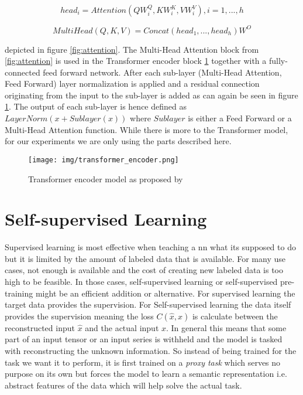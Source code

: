 \begin{equation}
	head_i = Attention(QW^Q_i, KW^K_i, VW^V_i), i = 1, ..., h
\end{equation}

\begin{equation}
	MultiHead(Q,K,V) = Concat(head_1, ..., head_h)W^O
\end{equation}

depicted in figure \ref{fig:attention}. The Multi-Head Attention block from \ref{fig:attention} is
used in the Transformer encoder block \ref{fig:transformer_encoder} together with a fully-connected feed forward network. After each sub-layer (Multi-Head Attention, Feed Forward) layer normalization is applied and a residual connection originating from the input to the sub-layer is added as can again be seen in figure \ref{fig:transformer_encoder}. The output of each sub-layer is hence defined as $LayerNorm(x + Sublayer(x))$ where $Sublayer$ is either a Feed Forward or a Multi-Head Attention function. While there is more to the Transformer model, for our experiments we are only using the parts described here.

\begin{figure}[h]
	\centering
	\texttt{[image: img/transformer\_encoder.png]}
	\caption{Transformer encoder model as proposed by \cite{attention_origin}}
	\label{fig:transformer_encoder}
\end{figure}

\section{Self-supervised Learning}

Supervised learning is most effective when teaching a \gls{nn} what its supposed to do but it is limited by the amount of labeled data that is available. For many use cases, not enough is available and the cost of creating new labeled data is too high to be feasible. In those cases, self-supervised learning or self-supervised pre-training might be an efficient addition or alternative. For supervised learning the target data provides the supervision. For Self-supervised learning the data itself provides the supervision meaning the loss $C(\hat{x},x)$ is calculate between the reconstructed input $\hat{x}$ and the actual input $x$. In general this means that some part of an input tensor or an input series is withheld and the model is tasked with reconstructing the unknown information. So instead of being trained for the task we want it to perform, it is first trained on a \textit{proxy task} which serves no purpose on its own but forces the model to learn a semantic representation i.e. abstract features of the data which will help solve the actual task. 

